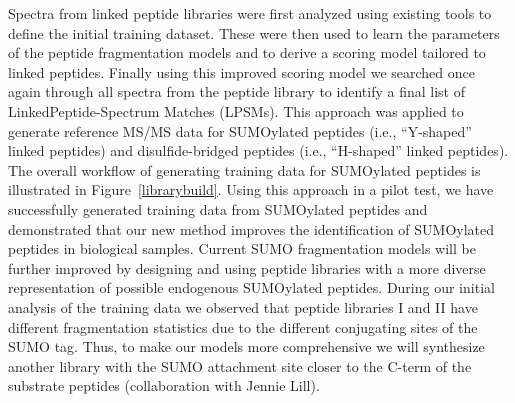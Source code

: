 Spectra from linked peptide libraries were first analyzed using existing tools to define the initial training dataset. These were then used to learn the parameters of the peptide fragmentation models and to derive a scoring model tailored to linked peptides. Finally using this improved scoring model we searched once again through all spectra from the peptide library to identify a final list of  LinkedPeptide-Spectrum Matches (LPSMs). This approach was applied to generate reference MS/MS data for  SUMOylated peptides (i.e., ``Y-shaped'' linked peptides) and disulfide-bridged peptides (i.e., ``H-shaped'' linked peptides). The overall workflow of generating training data for SUMOylated peptides is illustrated in Figure~\ref{librarybuild}. Using this approach in a pilot test, we have successfully generated training data from SUMOylated peptides 
and demonstrated that our new method improves the identification of SUMOylated peptides in biological samples. Current SUMO fragmentation models will  be further improved by designing and using peptide libraries with a more diverse representation of possible endogenous SUMOylated peptides.
During our initial analysis of the training data we observed that peptide libraries I and II have different fragmentation statistics due to the different conjugating sites of the SUMO tag. Thus, to make our models more comprehensive we will synthesize another library with the SUMO attachment site closer to the C-term of the substrate peptides (collaboration with Jennie Lill).

